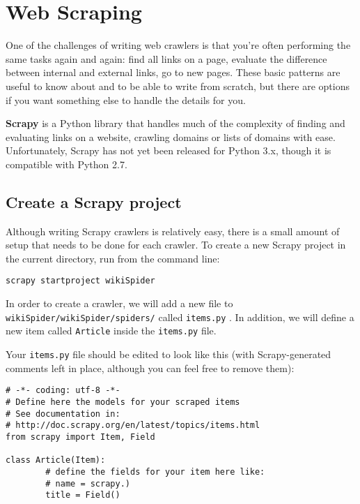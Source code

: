 \documentclass{article}
\begin{document}
    \section{Web Scraping}\label{web-scraping}

One of the challenges of writing web crawlers is that you're often
performing the same tasks again and again: find all links on a page,
evaluate the difference between internal and external links, go to new
pages. These basic patterns are useful to know about and to be able to
write from scratch, but there are options if you want something else to
handle the details for you.

\textbf{Scrapy} is a Python library that handles much of the complexity
of finding and evaluating links on a website, crawling domains or lists
of domains with ease. Unfortunately, Scrapy has not yet been released
for Python 3.x, though it is compatible with Python 2.7.

    \subsection{Create a Scrapy project}\label{create-a-scrapy-project}

Although writing Scrapy crawlers is relatively easy, there is a small
amount of setup that needs to be done for each crawler. To create a new
Scrapy project in the current directory, run from the command line:

\begin{verbatim}
scrapy startproject wikiSpider
\end{verbatim}

    In order to create a crawler, we will add a new file to
\texttt{wikiSpider/wikiSpider/spiders/} called \texttt{items.py} . In
addition, we will define a new item called \texttt{Article} inside the
\texttt{items.py} file.

    Your \texttt{items.py} file should be edited to look like this (with
Scrapy-generated comments left in place, although you can feel free to
remove them):

\begin{verbatim}
# -*- coding: utf-8 -*-
# Define here the models for your scraped items
# See documentation in:
# http://doc.scrapy.org/en/latest/topics/items.html
from scrapy import Item, Field

class Article(Item):
        # define the fields for your item here like:
        # name = scrapy.)
        title = Field()
\end{verbatim}
\end{document}
